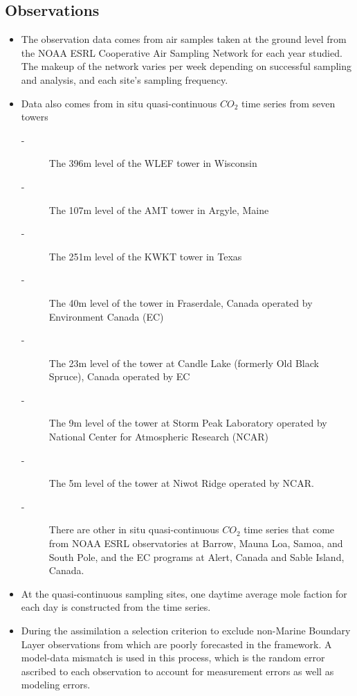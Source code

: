 \documentclass[12pt,letterpaper]{report}
\begin{document}
	\subsection*{Observations}
	 \begin{itemize}
	 \item The observation data comes from air samples taken at the ground level from the NOAA ESRL Cooperative Air Sampling Network for each year studied.  The makeup of the network varies per week depending on successful sampling and analysis, and each site’s sampling frequency.
	 \item Data also comes from in situ quasi-continuous $CO_2$ time series from seven towers
	  \begin{description}
	  \item[-] The 396m level of the WLEF tower in Wisconsin
	  \item[-] The 107m level of the AMT tower in Argyle, Maine
	  \item[-] The 251m level of the KWKT tower in Texas
	  \item[-] The 40m level of the tower in Fraserdale, Canada operated by Environment Canada (EC)
	  \item[-] The 23m level of the tower at Candle Lake (formerly Old Black Spruce), Canada operated by EC
	  \item[-] The 9m level of the tower at Storm Peak Laboratory operated by National Center for Atmospheric Research (NCAR)
	  \item[-] The 5m level of the tower at Niwot Ridge operated by NCAR.
	  \item[-] There are other in situ quasi-continuous $CO_2$ time series that come from NOAA ESRL observatories at Barrow, Mauna Loa, Samoa, and South Pole, and the EC programs at Alert, Canada and Sable Island, Canada.
	  \end{description}
	 \item At the quasi-continuous sampling sites, one daytime average mole faction for each day is constructed from the time series.
	 \item During the assimilation a selection criterion to exclude non-Marine Boundary Layer observations from which are poorly forecasted in the framework.  A model-data mismatch is used in this process, which is the random error ascribed to each observation to account for measurement errors as well as modeling errors.
	 \end{itemize}
\end{document}
